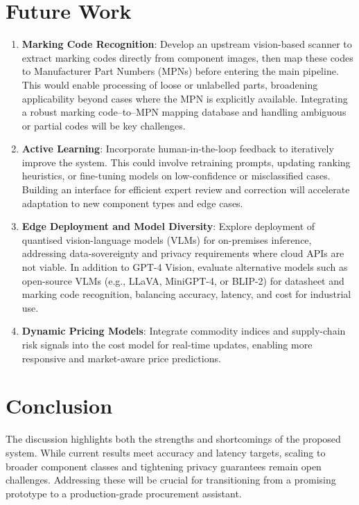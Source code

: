 \section{Future Work}
\begin{enumerate}
  \item \textbf{Marking Code Recognition}: Develop an upstream vision-based scanner to extract marking codes directly from component images, then map these codes to Manufacturer Part Numbers (MPNs) before entering the main pipeline. This would enable processing of loose or unlabelled parts, broadening applicability beyond cases where the MPN is explicitly available. Integrating a robust marking code–to–MPN mapping database and handling ambiguous or partial codes will be key challenges.
  \item \textbf{Active Learning}: Incorporate human-in-the-loop feedback to iteratively improve the system. This could involve retraining prompts, updating ranking heuristics, or fine-tuning models on low-confidence or misclassified cases. Building an interface for efficient expert review and correction will accelerate adaptation to new component types and edge cases.
  \item \textbf{Edge Deployment and Model Diversity}: Explore deployment of quantised vision-language models (VLMs) for on-premises inference, addressing data-sovereignty and privacy requirements where cloud APIs are not viable. In addition to GPT-4 Vision, evaluate alternative models such as open-source VLMs (e.g., LLaVA, MiniGPT-4, or BLIP-2) for datasheet and marking code recognition, balancing accuracy, latency, and cost for industrial use.
  \item \textbf{Dynamic Pricing Models}: Integrate commodity indices and supply-chain risk signals into the cost model for real-time updates, enabling more responsive and market-aware price predictions.
\end{enumerate}

\section{Conclusion}
The discussion highlights both the strengths and shortcomings of the proposed system.  While current results meet accuracy and latency targets, scaling to broader component classes and tightening privacy guarantees remain open challenges.  Addressing these will be crucial for transitioning from a promising prototype to a production-grade procurement assistant.